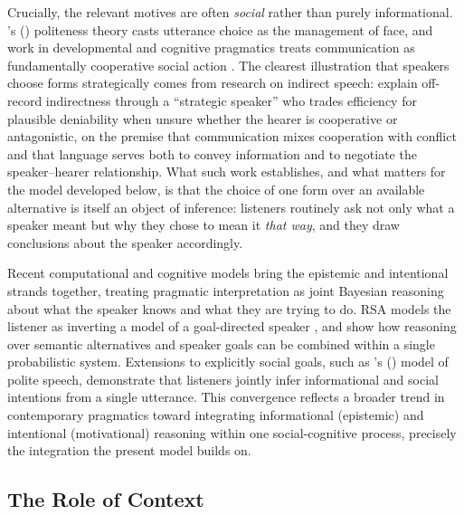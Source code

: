 \documentclass[12pt,a4paper]{article}
\begin{document}
Crucially, the relevant motives are often \emph{social} rather than purely
informational. \citeauthor{brownlevinson1987}'s (\citeyear{brownlevinson1987})
politeness theory casts utterance choice as the management of face, and work in
developmental and cognitive pragmatics treats communication as fundamentally
cooperative social action \citep{Tomasello2003,Clark1996}. The clearest
illustration that speakers choose forms strategically comes from research on
indirect speech: \citet{LeePinker2010} explain off-record indirectness through a
``strategic speaker'' who trades efficiency for plausible deniability when
unsure whether the hearer is cooperative or antagonistic, on the premise that
communication mixes cooperation with conflict and that language serves both to
convey information and to negotiate the speaker--hearer relationship. What such
work establishes, and what matters for the model developed below, is that the
choice of one form over an available alternative is itself an object of
inference: listeners routinely ask not only what a speaker meant but why they
chose to mean it \emph{that way}, and they draw conclusions about the speaker
accordingly.

Recent computational and cognitive models bring the epistemic and intentional
strands together, treating pragmatic interpretation as joint Bayesian reasoning
about what the speaker knows and what they are trying to do. 
RSA models the listener as inverting a model of a
goal-directed speaker \citep{frank2012,goodman2016},
and \citet{bergen2016} show how reasoning over
semantic alternatives and speaker goals can be combined within a single
probabilistic system. Extensions to explicitly social goals, such as
\citeauthor{yoontessleretal2020}'s (\citeyear{yoontessleretal2020}) model of
polite speech, demonstrate that listeners jointly infer informational and social
intentions from a single utterance. This convergence reflects a broader trend in
contemporary pragmatics toward integrating informational (epistemic) and
intentional (motivational) reasoning within one social-cognitive process,
precisely the integration the present model builds on.


\subsection{The Role of Context}
\end{document}
